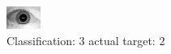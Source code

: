\begin{figure}[h!]
\begin{center}
\includegraphics[width=0.60\columnwidth]{figures/ID1651_class_3_target_2.png}
\end{center}
\caption{ Classification: 3 actual target: 2}
\label{fig:ID1651_class_3_target_2}
\end{figure}
